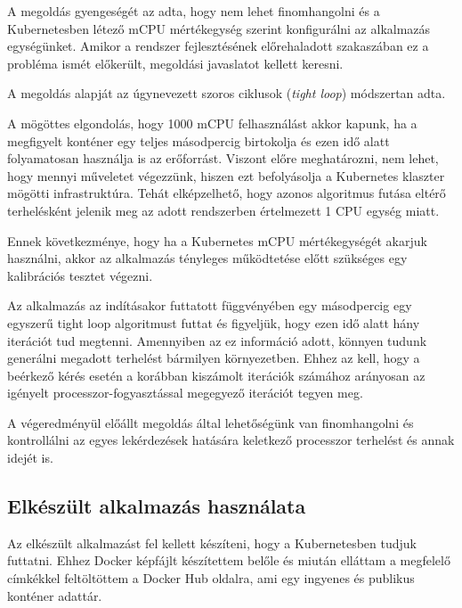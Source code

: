 A megoldás gyengeségét az adta, hogy nem lehet finomhangolni és a Kubernetesben létező mCPU mértékegység szerint konfigurálni az alkalmazás egységünket.
Amikor a rendszer fejlesztésének előrehaladott szakaszában ez a probléma ismét előkerült, megoldási javaslatot kellett keresni.

A megoldás alapját az úgynevezett szoros ciklusok (\textit{tight loop}\citep{tightLoop}) módszertan adta.

A mögöttes elgondolás, hogy 1000 mCPU felhasználást akkor kapunk, ha a megfigyelt konténer egy teljes másodpercig birtokolja és ezen idő alatt folyamatosan használja is az erőforrást.
Viszont előre meghatározni, nem lehet, hogy mennyi műveletet végezzünk, hiszen ezt befolyásolja a Kubernetes klaszter mögötti infrastruktúra.
Tehát elképzelhető, hogy azonos algoritmus futása eltérő terhelésként jelenik meg az adott rendszerben értelmezett 1 CPU egység miatt.

Ennek következménye, hogy ha a Kubernetes mCPU mértékegységét akarjuk használni, akkor az alkalmazás tényleges működtetése előtt szükséges egy kalibrációs tesztet végezni.

Az alkalmazás az indításakor futtatott függvényében egy másodpercig egy egyszerű tight loop algoritmust futtat és figyeljük, hogy ezen idő alatt hány iterációt tud megtenni.
Amennyiben az ez információ adott, könnyen tudunk generálni megadott terhelést bármilyen környezetben.
Ehhez az kell, hogy a beérkező kérés esetén a korábban kiszámolt iterációk számához arányosan az igényelt processzor-fogyasztással megegyező iterációt tegyen meg. 

A végeredményül előállt megoldás által lehetőségünk van finomhangolni és kontrollálni az egyes lekérdezések hatására keletkező processzor terhelést és annak idejét is. 

\subsection{Elkészült alkalmazás használata}
Az elkészült alkalmazást fel kellett készíteni, hogy a Kubernetesben tudjuk futtatni. Ehhez Docker képfájlt készítettem belőle és miután elláttam a megfelelő címkékkel feltöltöttem\citep{dockerContainer} a Docker Hub oldalra, ami egy ingyenes és publikus konténer adattár. \\

\lstset{caption=Konténer futtatása és válasza, label=describe_pod}


